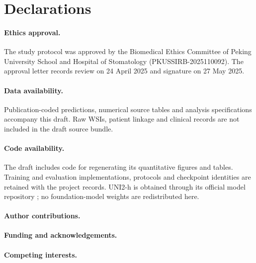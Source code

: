 \section*{Declarations}
\paragraph{Ethics approval.}
The study protocol was approved by the Biomedical Ethics Committee of Peking University School and Hospital of Stomatology (PKUSSIRB-2025110092). The approval letter records review on 24 April 2025 and signature on 27 May 2025. 

\paragraph{Data availability.}
Publication-coded predictions, numerical source tables and analysis specifications accompany this draft. Raw WSIs, patient linkage and clinical records are not included in the draft source bundle. 

\paragraph{Code availability.}
The draft includes code for regenerating its quantitative figures and tables. Training and evaluation implementations, protocols and checkpoint identities are retained with the project records.  UNI2-h is obtained through its official model repository \citep{uni2card}; no foundation-model weights are redistributed here.

\paragraph{Author contributions.} 
\paragraph{Funding and acknowledgements.} 
\paragraph{Competing interests.} 
